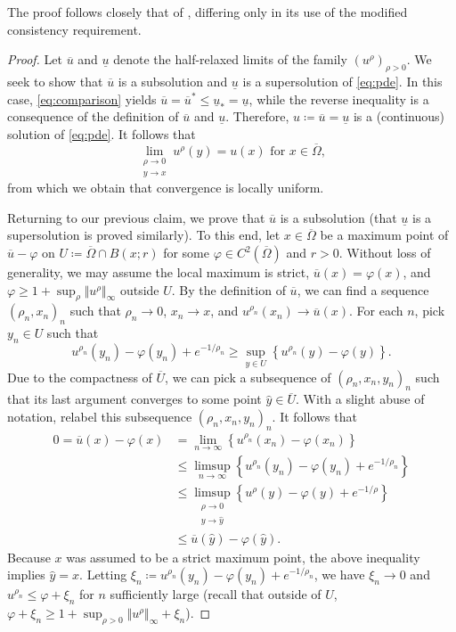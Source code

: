 \documentclass[12pt]{article}
\begin{document}
The proof follows closely that of \cite[Theorem 2.1]{MR1115933},
differing only in its use of the modified consistency requirement.
\begin{proof}
Let $\overline{u}$ and $\underline{u}$ denote the half-relaxed limits
of the family $(u^{\rho})_{\rho>0}$. We seek to show that $\overline{u}$
is a subsolution and $\underline{u}$ is a supersolution of \eqref{eq:pde}.
In this case, \eqref{eq:comparison} yields $\overline{u}=\overline{u}^{*}{\leqslant}\underline{u}_{*}=\underline{u}$,
while the reverse inequality is a consequence of the definition of
$\overline{u}$ and $\underline{u}$. Therefore, $u\coloneqq\overline{u}=\underline{u}$
is a (continuous) solution of \eqref{eq:pde}. It follows that
\[
\lim_{\substack{\rho\rightarrow0\\
y\rightarrow x
}
}u^{\rho}(y)=u(x)\text{ for }x\in\overline{\Omega},
\]
from which we obtain that convergence is locally uniform.

Returning to our previous claim, we prove that $\overline{u}$ is
a subsolution (that $\underline{u}$ is a supersolution is proved
similarly). To this end, let $x\in\overline{\Omega}$ be a maximum
point of $\overline{u}-\varphi$ on $U\coloneqq\overline{\Omega}\cap B(x;r)$
for some $\varphi\in C^{2}(\overline{\Omega})$ and $r>0$. Without
loss of generality, we may assume the local maximum is strict, $\overline{u}(x)=\varphi(x)$,
and $\varphi{\geqslant}1+\sup_{\rho}\Vert u^{\rho}\Vert_{\infty}$ outside
$U$. By the definition of $\overline{u}$, we can find a sequence
$(\rho_{n},x_{n})_{n}$ such that $\rho_{n}\rightarrow0$, $x_{n}\rightarrow x$,
and $u^{\rho_{n}}(x_{n})\rightarrow\overline{u}(x)$. For each $n$,
pick $y_{n}\in U$ such that
\[
u^{\rho_{n}}(y_{n})-\varphi(y_{n})+e^{-1/\rho_{n}}{\geqslant}\sup_{y\in U}\left\{ u^{\rho_{n}}(y)-\varphi(y)\right\} .
\]
Due to the compactness of $\overline{U}$, we can pick a subsequence
of $(\rho_{n},x_{n},y_{n})_{n}$ such that its last argument converges
to some point $\hat{y}\in\overline{U}$. With a slight abuse of notation,
relabel this subsequence $(\rho_{n},x_{n},y_{n})_{n}$. It follows
that
\begin{align*}
0=\overline{u}(x)-\varphi(x) & =\lim_{n\rightarrow\infty}\left\{ u^{\rho_{n}}(x_{n})-\varphi(x_{n})\right\} \\
 & {\leqslant}\limsup_{n\rightarrow\infty}\left\{ u^{\rho_{n}}(y_{n})-\varphi(y_{n})+e^{-1/\rho_{n}}\right\} \\
 & {\leqslant}\limsup_{\substack{\rho\rightarrow0\\
y\rightarrow\hat{y}
}
}\left\{ u^{\rho}(y)-\varphi(y)+e^{-1/\rho}\right\} \\
 & {\leqslant}\overline{u}(\hat{y})-\varphi(\hat{y}).
\end{align*}
Because $x$ was assumed to be a strict maximum point, the above inequality
implies $\hat{y}=x$. Letting $\xi_{n}\coloneqq u^{\rho_{n}}(y_{n})-\varphi(y_{n})+e^{-1/\rho_{n}}$,
we have $\xi_{n}\rightarrow0$ and $u^{\rho_{n}}{\leqslant}\varphi+\xi_{n}$
for $n$ sufficiently large (recall that outside of $U$, $\varphi+\xi_{n}{\geqslant}1+\sup_{\rho>0}\Vert u^{\rho}\Vert_{\infty}+\xi_{n}$).


\end{proof}
\end{document}
